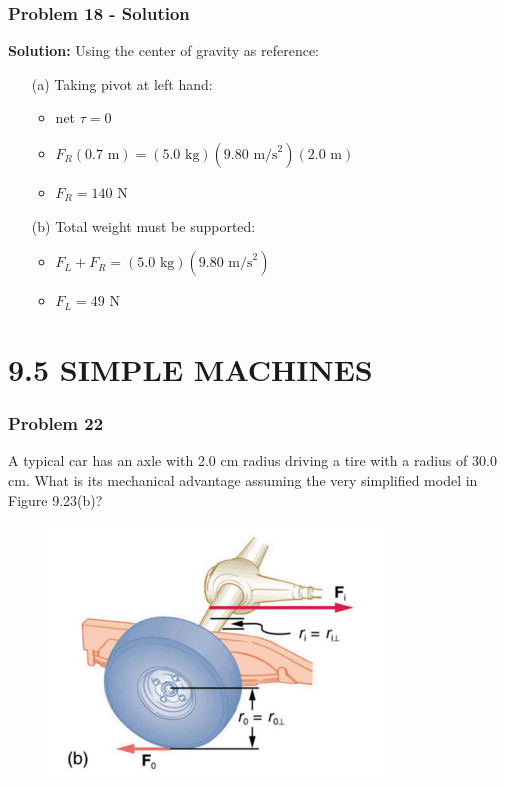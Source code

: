 \documentclass{beamer}
\begin{document}
\begin{frame}
\frametitle{Problem 18 - Solution}
\textbf{Solution:}
Using the center of gravity as reference:
\begin{itemize}
    \item[(a)] Taking pivot at left hand:
    \begin{itemize}
        \item net $\tau = 0$
        \item $F_R(0.7 \text{ m}) = (5.0 \text{ kg})(9.80 \text{ m/s}^2)(2.0 \text{ m})$
        \item $F_R = 140 \text{ N}$
    \end{itemize}
    \item[(b)] Total weight must be supported:
    \begin{itemize}
        \item $F_L + F_R = (5.0 \text{ kg})(9.80 \text{ m/s}^2)$
        \item $F_L = 49 \text{ N}$
    \end{itemize}
\end{itemize}
\end{frame}

\section{9.5 SIMPLE MACHINES}

\begin{frame}
\frametitle{Problem 22}
A typical car has an axle with 2.0 cm radius driving a tire with a radius of 30.0 cm. What is its mechanical advantage assuming the very simplified model in Figure 9.23(b)?
\begin{figure}[H]
    \centering
    \includegraphics[width=0.7\linewidth]{CH9/Screenshot 2024-11-04 122444.png}
\end{figure}

\end{frame}
\end{document}
